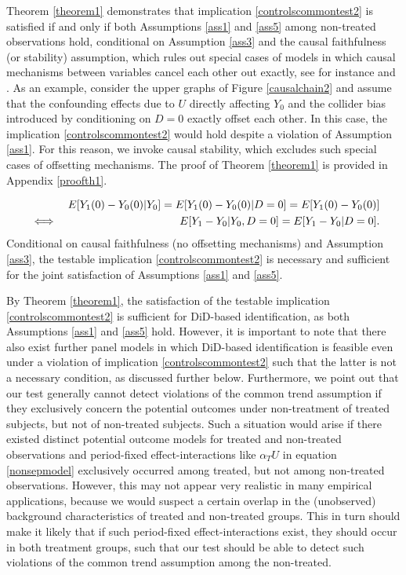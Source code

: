 {	Theorem \ref{theorem1} demonstrates that implication \eqref{controlscommontest2} is satisfied if and only if both Assumptions \ref{ass1} and \ref{ass5} among non-treated observations hold, conditional on Assumption \ref{ass3} and the causal faithfulness (or stability) assumption, which rules out special cases of models in which causal mechanisms between variables cancel each other out exactly, see for instance \citet{spirtes2000causation} and \citet{Pearl00}. As an example, consider the upper graphs of Figure \ref{causalchain2} and assume that the confounding effects due to $U$ directly affecting $Y_0$ and the collider bias introduced by conditioning on $D=0$ exactly offset each other. In this case, the implication \eqref{controlscommontest2} would hold despite a violation of Assumption \ref{ass1}. For this reason, we invoke causal stability, which excludes such special cases of offsetting mechanisms. The proof of Theorem \ref{theorem1} is provided in Appendix \ref{proofth1}.
	\begin{theorem}\label{theorem1}
		\begin{eqnarray*}
			&&E[Y_1(0)-Y_0(0)| Y_0]=E[Y_1(0)-Y_0(0)|D=0]=E[Y_1(0)-Y_0(0)]\\ &\iff&  E[Y_1-Y_0|Y_0,D=0]=E[Y_1-Y_0|D=0].\notag
		\end{eqnarray*}
		Conditional on 		causal faithfulness (no offsetting mechanisms) and Assumption \ref{ass3}, the testable implication \eqref{controlscommontest2} is necessary and sufficient for the joint satisfaction of Assumptions \ref{ass1} and \ref{ass5}.
	\end{theorem}
	
	By Theorem \ref{theorem1}, the satisfaction of the testable implication \eqref{controlscommontest2} is sufficient for DiD-based identification, as both Assumptions \ref{ass1} and \ref{ass5} hold. However, it is important to note that there also exist further panel models in which DiD-based identification is feasible even under a violation of implication \eqref{controlscommontest2} such that the latter is not a necessary condition, as discussed further below. Furthermore, we point out that our test generally cannot detect violations of the common trend assumption if they exclusively concern the potential outcomes under non-treatment of treated subjects, but not of non-treated subjects. Such a situation would arise if there existed distinct potential outcome models for treated and non-treated observations and period-fixed effect-interactions like $\alpha_T  U$ in equation \eqref{nonsepmodel}  exclusively occurred among treated, but not among non-treated observations. However, this may not appear very realistic in many empirical applications, because we would suspect a certain overlap in the (unobserved) background characteristics of treated and non-treated groups. This in turn should make it likely that if such period-fixed effect-interactions exist, they should occur in both treatment groups, such that our test should be able to detect such violations of the common trend assumption among the non-treated.
	
}
